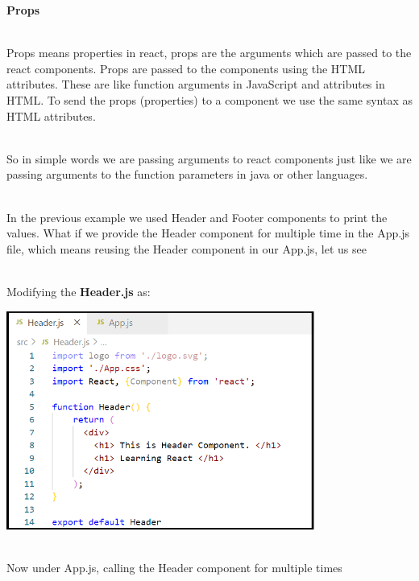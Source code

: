 \documentclass{article}
\begin{document}
\noindent \textbf{Props}

\noindent \\
Props means properties in react, props are the arguments which are passed to the react components. Props are passed to the components using the HTML attributes. These are like function arguments in JavaScript and attributes in HTML. To send the props (properties) to a component we use the same syntax as HTML attributes.

\noindent 

\noindent \\
So in simple words we are passing arguments to react components just like we are passing arguments to the function parameters in java or other languages.

\noindent 

\noindent \\
In the previous example we used Header and Footer components to print the values. What if we provide the Header component for multiple time in the App.js file, which means reusing the Header component in our App.js, let us see

\noindent 

\noindent \\
Modifying the \textbf{Header.js} as:

\begin{center}
	\noindent \includegraphics*[width=3.98in, height=2.83in]{IMG-08-01}
\end{center}

\newpage

\noindent \\
Now under App.js, calling the Header component for multiple times
\end{document}
